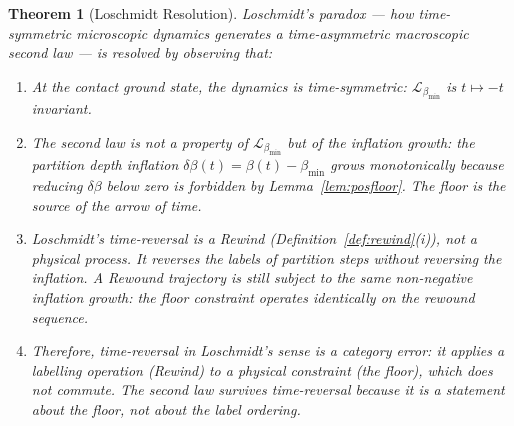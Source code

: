 \documentclass[12pt, a4paper]{article}
\theoremstyle{plain}
\newtheorem{theorem}{Theorem}[section]
\theoremstyle{definition}
\theoremstyle{remark}
\newcommand{\bmin}{\beta_{\min}}
\newcommand{\Lmin}{\mathcal{L}_{\bmin}}
\begin{document}
\begin{theorem}[Loschmidt Resolution]
\label{thm:loschmidt}
Loschmidt's paradox --- how time-symmetric microscopic dynamics generates a
time-asymmetric macroscopic second law --- is resolved by observing that:
\begin{enumerate}[label=(\roman*)]
  \item At the contact ground state, the dynamics \emph{is} time-symmetric:
  $\Lmin$ is $t \mapsto -t$ invariant.
  \item The second law is not a property of $\Lmin$ but of the inflation
  growth: the partition depth inflation $\delta\beta(t) = \beta(t) - \bmin$
  grows monotonically because reducing $\delta\beta$ below zero is forbidden
  by Lemma~\ref{lem:posfloor}. The floor is the source of the arrow of time.
  \item Loschmidt's time-reversal is a Rewind (Definition~\ref{def:rewind}(i)),
  not a physical process. It reverses the \emph{labels} of partition steps
  without reversing the inflation. A Rewound trajectory is still subject to
  the same non-negative inflation growth: the floor constraint operates
  identically on the rewound sequence.
  \item Therefore, time-reversal in Loschmidt's sense is a category error:
  it applies a labelling operation (Rewind) to a physical constraint (the
  floor), which does not commute. The second law survives time-reversal
  because it is a statement about the floor, not about the label ordering.
\end{enumerate}
\end{theorem}
\end{document}
